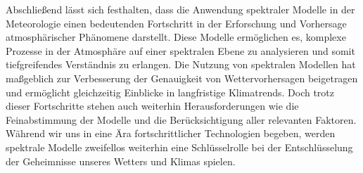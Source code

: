 Abschließend lässt sich festhalten, dass die Anwendung spektraler Modelle in der Meteorologie einen bedeutenden Fortschritt in der Erforschung und Vorhersage atmosphärischer Phänomene darstellt.
Diese Modelle ermöglichen es, komplexe Prozesse in der Atmosphäre auf einer spektralen Ebene zu analysieren und somit tiefgreifendes Verständnis zu erlangen.
Die Nutzung von spektralen Modellen hat maßgeblich zur Verbesserung der Genauigkeit von Wettervorhersagen beigetragen und ermöglicht gleichzeitig Einblicke in langfristige Klimatrends.
Doch trotz dieser Fortschritte stehen auch weiterhin Herausforderungen wie die Feinabstimmung der Modelle und die Berücksichtigung aller relevanten Faktoren.
Während wir uns in eine Ära fortschrittlicher Technologien begeben, werden spektrale Modelle zweifellos weiterhin eine Schlüsselrolle bei der Entschlüsselung der Geheimnisse unseres Wetters und Klimas spielen.
